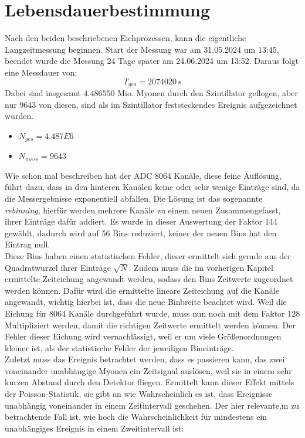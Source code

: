 \documentclass[12pt,a4paper,ngerman]{report}
\begin{document}
		
	\section{Lebensdauerbestimmung}
	Nach den beiden beschriebenen Eichprozessen, kann die eigentliche Langzeitmessung beginnen. Start der Messung war am 31.05.2024 um 13:45, beendet wurde die Messung 24 Tage später am 24.06.2024 um 13:52. Daraus folgt eine Messdauer von:
	\begin{equation}
		T_{ges} = \SI{2074020}{\second}
	\end{equation}
	Dabei sind insgesamt $4.486550$ Mio. Myonen durch den Szintillator geflogen, aber nur $9643$ von diesen, sind als im Szintillator feststeckendes Ereignis aufgezeichnet wurden.
	\begin{itemize}
		\item $N_{ges} = 4.487E6$
		\item $N_{mess} = 9643$
	\end{itemize}
	Wie schon mal beschreiben hat der ADC 8064 Kanäle, diese feine Auflösung, führt dazu, dass in den hinteren Kanälen keine oder sehr wenige Einträge sind, da die Messergebnisse exponentiell abfallen. Die Lösung ist das sogenannte \textit{rebinning}, hierfür werden mehrere Kanäle zu einem neuen Zusammengefasst, ihrer Einträge dafür addiert. Es wurde in dieser Auswertung der Faktor 144 gewählt, dadurch wird auf 56 Bins reduziert, keiner der neuen Bins hat den Eintrag null.\\
	Diese Bins haben einen statistischen Fehler, dieser ermittelt sich gerade aus der Quadratwurzel ihrer Einträge $\sqrt{N}$. Zudem muss die im vorherigen Kapitel ermittelte Zeiteichung angewandt werden, sodass den Bins Zeitwerte zugeordnet werden können. Dafür wird die ermittelte lineare Zeiteichung auf die Kanäle angewandt, wichtig hierbei ist, dass die neue Binbreite beachtet wird. Weil die Eichung für 8064 Kanäle durchgeführt wurde, muss nun noch mit dem Faktor 128 Multipliziert werden, damit die richtigen Zeitwerte ermittelt werden können. Der Fehler dieser Eichung wird vernachlässigt, weil er um viele Größenordnungen kleiner ist, als der statistische Fehler der jeweiligen Bineinträge.\\
	Zuletzt muss das Ereignis betrachtet werden, dass es passieren kann, das zwei voneinander unabhängige Myonen ein Zeitsignal auslösen, weil sie in einem sehr kurzen Abstand durch den Detektor fliegen. Ermittelt kann dieser Effekt mittels der Poisson-Statistik, sie gibt an wie Wahrscheinlich es ist, dass Ereignisse unabhängig voneinander in einem Zeitintervall geschehen. Der hier relevante,m zu betrachtende Fall ist, wie hoch die Wahrscheinlichkeit für mindestens ein unabhängiges Ereignis in einem Zweitintervall ist:
\end{document}

